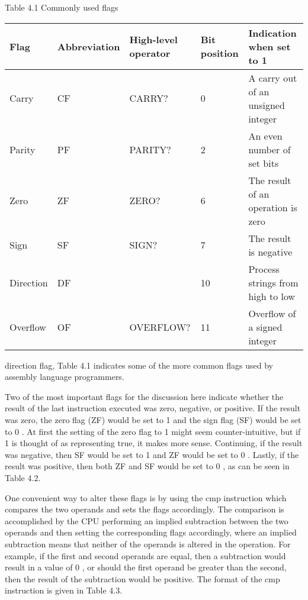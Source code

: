 \documentclass[10pt]{article}
\begin{document}
Table 4.1 Commonly used flags

\begin{center}
\begin{tabular}{|l|l|l|l|l|}
\hline
Flag & Abbreviation & High-level operator & Bit position & Indication when set to 1 \\
\hline
Carry & CF & CARRY? & 0 & A carry out of an unsigned integer \\
\hline
Parity & PF & PARITY? & 2 & An even number of set bits \\
\hline
Zero & ZF & ZERO? & 6 & The result of an operation is zero \\
\hline
Sign & SF & SIGN? & 7 & The result is negative \\
\hline
Direction & DF &  & 10 & Process strings from high to low \\
\hline
Overflow & OF & OVERFLOW? & 11 & Overflow of a signed integer \\
\hline
\end{tabular}
\end{center}

direction flag, Table 4.1 indicates some of the more common flags used by assembly language programmers.

Two of the most important flags for the discussion here indicate whether the result of the last instruction executed was zero, negative, or positive. If the result was zero, the zero flag (ZF) would be set to 1 and the sign flag (SF) would be set to 0 . At first the setting of the zero flag to 1 might seem counter-intuitive, but if 1 is thought of as representing true, it makes more sense. Continuing, if the result was negative, then SF would be set to 1 and ZF would be set to 0 . Lastly, if the result was positive, then both ZF and SF would be set to 0 , as can be seen in Table 4.2.

One convenient way to alter these flags is by using the cmp instruction which compares the two operands and sets the flags accordingly. The comparison is accomplished by the CPU performing an implied subtraction between the two operands and then setting the corresponding flags accordingly, where an implied subtraction means that neither of the operands is altered in the operation. For example, if the first and second operands are equal, then a subtraction would result in a value of 0 , or should the first operand be greater than the second, then the result of the subtraction would be positive. The format of the cmp instruction is given in Table 4.3.
\end{document}
